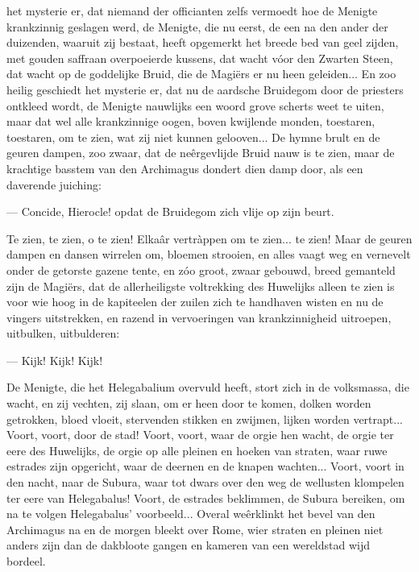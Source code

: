 \documentclass[a4paper, 12pt, oneside, dutch]{article}
\begin{document}
het mysterie er, dat niemand der officianten zelfs vermoedt hoe de Menigte krankzinnig geslagen werd, de Menigte, die nu eerst, de een na den ander der duizenden, waaruit zij bestaat, heeft opgemerkt het breede bed van geel zijden, met gouden saffraan overpoeierde kussens, dat wacht vóor den Zwarten Steen, dat wacht op de goddelijke Bruid, die de Magiërs er nu heen geleiden... En zoo heilig geschiedt het mysterie er, dat nu de aardsche Bruidegom door de priesters ontkleed wordt, de Menigte nauwlijks een woord grove scherts weet te uiten, maar dat wel alle krankzinnige oogen, boven kwijlende monden, toestaren, toestaren, om te zien, wat zij niet kunnen gelooven... De hymne brult en de geuren dampen, zoo zwaar, dat de neêrgevlijde Bruid nauw is te zien, maar de krachtige basstem van den Archimagus dondert dien damp door, als een daverende juiching:

--- Concide, Hierocle! opdat de Bruidegom zich vlije op zijn beurt.

Te zien, te zien, o te zien! Elkaâr vertràppen om te zien... te zien! Maar de geuren dampen en dansen wirrelen om, bloemen strooien, en alles vaagt weg en vernevelt onder de getorste gazene tente, en zóo groot, zwaar gebouwd, breed gemanteld zijn de Magiërs, dat de allerheiligste voltrekking des Huwelijks alleen te zien is voor wie hoog in de kapiteelen der zuilen zich te handhaven wisten en nu de vingers uitstrekken, en razend in vervoeringen van krankzinnigheid uitroepen, uitbulken, uitbulderen:

--- Kijk! Kijk! Kijk!

De Menigte, die het Helegabalium overvuld heeft, stort zich in de volksmassa, die wacht, en zij vechten, zij slaan, om er heen door te komen, dolken worden getrokken, bloed vloeit, stervenden stikken en zwijmen, lijken worden vertrapt... Voort, voort, door de stad! Voort, voort, waar de orgie hen wacht, de orgie ter eere des Huwelijks, de orgie op alle pleinen en hoeken van straten, waar ruwe estrades zijn opgericht, waar de deernen en de knapen wachten... Voort, voort in den nacht, naar de Subura, waar tot dwars over den weg de wellusten klompelen ter eere van Helegabalus! Voort, de estrades beklimmen, de Subura bereiken, om na te volgen Helegabalus' voorbeeld... Overal weêrklinkt het bevel van den Archimagus na en de morgen bleekt over Rome, wier straten en pleinen niet anders zijn dan de dakbloote gangen en kameren van een wereldstad wijd bordeel.

\subsection{}
\end{document}
